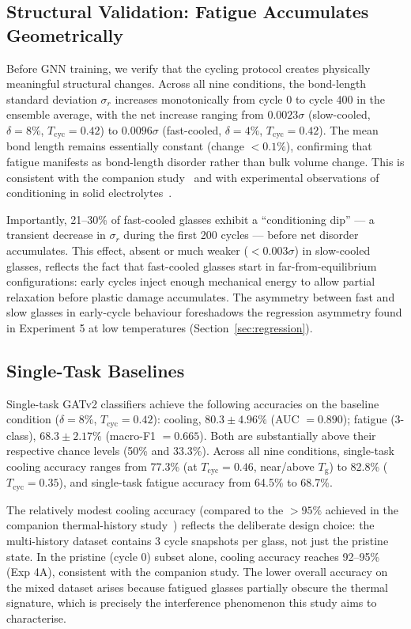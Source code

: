 \documentclass[12pt,a4paper]{article}
\newcommand{\Tg}{T_{\mathrm{g}}}
\newcommand{\Tbat}{T_{\mathrm{cyc}}}
\newcommand{\sigr}{\sigma_r}
\begin{document}
\subsection{Structural Validation: Fatigue Accumulates Geometrically}
\label{sec:structural}

Before GNN training, we verify that the cycling protocol creates physically meaningful structural changes.
Across all nine conditions, the bond-length standard deviation $\sigr$ increases monotonically from cycle 0 to cycle 400 in the ensemble average, with the net increase ranging from $0.0023\sigma$ (slow-cooled, $\delta=8\%$, $\Tbat=0.42$) to $0.0096\sigma$ (fast-cooled, $\delta=4\%$, $\Tbat=0.42$).
The mean bond length remains essentially constant (change $<0.1\%$), confirming that fatigue manifests as bond-length disorder rather than bulk volume change.
This is consistent with the companion study~\cite{Singh2025Paper2} and with experimental observations of conditioning in solid electrolytes~\cite{Sakamoto2013}.

Importantly, 21--30\% of fast-cooled glasses exhibit a ``conditioning dip'' — a transient decrease in $\sigr$ during the first 200 cycles — before net disorder accumulates.
This effect, absent or much weaker ($<0.003\sigma$) in slow-cooled glasses, reflects the fact that fast-cooled glasses start in far-from-equilibrium configurations: early cycles inject enough mechanical energy to allow partial relaxation before plastic damage accumulates.
The asymmetry between fast and slow glasses in early-cycle behaviour foreshadows the regression asymmetry found in Experiment 5 at low temperatures (Section~\ref{sec:regression}).

\subsection{Single-Task Baselines}
\label{sec:singletask}

Single-task GATv2 classifiers achieve the following accuracies on the baseline condition ($\delta = 8\%$, $\Tbat = 0.42$):
cooling, $80.3 \pm 4.96\%$ (AUC $= 0.890$); fatigue (3-class), $68.3 \pm 2.17\%$ (macro-F1 $= 0.665$).
Both are substantially above their respective chance levels (50\% and 33.3\%).
Across all nine conditions, single-task cooling accuracy ranges from 77.3\% (at $\Tbat = 0.46$, near/above $\Tg$) to 82.8\% ($\Tbat = 0.35$), and single-task fatigue accuracy from 64.5\% to 68.7\%.

The relatively modest cooling accuracy (compared to the $>95\%$ achieved in the companion thermal-history study~\cite{Singh2025Paper1}) reflects the deliberate design choice: the multi-history dataset contains 3 cycle snapshots per glass, not just the pristine state.
In the pristine (cycle 0) subset alone, cooling accuracy reaches 92--95\% (Exp 4A), consistent with the companion study.
The lower overall accuracy on the mixed dataset arises because fatigued glasses partially obscure the thermal signature, which is precisely the interference phenomenon this study aims to characterise.
\end{document}
